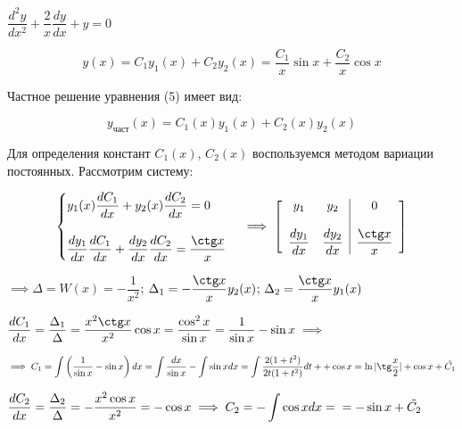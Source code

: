 \documentclass[a4paper, 12pt]{article}
\begin{document}
	\begin{center}
		$\dfrac{d^2 y}{dx^2} + \dfrac{2}{x} \dfrac{dy}{dx} + y = 0$
	\end{center}
	\begin{equation}
		y(x) = C_1 y_1 (x) + C_2 y_2 (x) = \dfrac{C_1}{x}\sin x + \dfrac{C_2}{x}\cos x
	\end{equation}
	
	\quad Частное решение уравнения (5) имеет вид: 
	
	\begin{equation}
		y_{\text{част}}(x) = C_1 (x) y_1 (x) + C_2 (x) y_2 (x) 
	\end{equation}

	\quad Для определения констант $C_1 (x)$, $C_2 (x)$ воспользуемся методом вариации постоянных. Рассмотрим систему: 
	
	\begin{equation}
		\begin{cases}
			y_1 (x)\dfrac{dC_1}{dx} + y_2 (x)\dfrac{dC_2}{dx} = 0 \\
			\\
			\dfrac{dy_1}{dx} \dfrac{dC_1}{dx} + \dfrac{dy_2}{dx}\dfrac{dC_2}{dx} = \dfrac{\ctg x}{x} 
		\end{cases} \implies \left[\begin{array}{cc|c }
			y_1 & y_2 & 0 \\
			& & \\
			\dfrac{dy_1}{dx} & \dfrac{d y_2}{dx} & \dfrac{\ctg x}{x}
		\end{array}\right]
	\end{equation}
	
	\begin{center}
		$\implies \Delta = W(x) = -\dfrac{1}{x^2}$; $\Delta_1 = -\dfrac{\ctg x}{x}y_2(x)$; $\Delta_2 = \dfrac{\ctg x}{x} y_1 (x)$
	\end{center}
	
	\quad $\dfrac{dC_1}{dx} = \dfrac{\Delta_1}{\Delta} = \dfrac{x^2 \ctg x}{x^2}\cos x = \dfrac{\cos^2 x}{\sin x} = \dfrac{1}{\sin x} - \sin x \implies $
	
	$\implies C_1 = \displaystyle\int\left(\dfrac{1}{\sin x} -\sin x\right)dx = \displaystyle\int\dfrac{dx}{\sin x} - \displaystyle\int\sin x dx = \displaystyle\int\dfrac{2(1 + t^2)}{2t(1 + t^2)}dt + +\cos x = \ln|\tg \dfrac{x}{2}| + \cos x + \tilde{C_1}$
	
	\quad $\dfrac{dC_2}{dx} = \dfrac{\Delta_2}{\Delta} = -\dfrac{x^2 \cos x}{x^2} = -\cos x \implies  C_2 = -\displaystyle\int\cos x dx =\newline= -\sin x + \tilde{C_2}$
	
\end{document}
